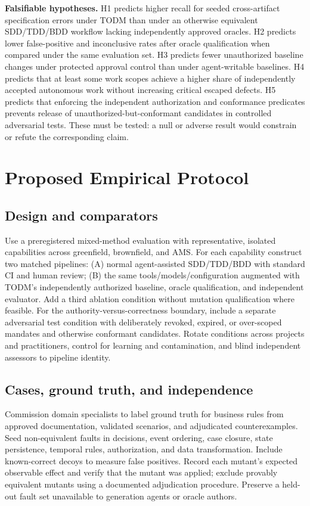 \documentclass[11pt,a4paper]{article}
\begin{document}
\textbf{Falsifiable hypotheses.} H1 predicts higher recall for seeded cross-artifact specification errors under TODM than under an otherwise equivalent SDD/TDD/BDD workflow lacking independently approved oracles. H2 predicts lower false-positive and inconclusive rates after oracle qualification when compared under the same evaluation set. H3 predicts fewer unauthorized baseline changes under protected approval control than under agent-writable baselines. H4 predicts that at least some work scopes achieve a higher share of independently accepted autonomous work without increasing critical escaped defects. H5 predicts that enforcing the independent authorization and conformance predicates prevents release of unauthorized-but-conformant candidates in controlled adversarial tests. These must be tested: a null or adverse result would constrain or refute the corresponding claim.

\section{Proposed Empirical Protocol}
\subsection{Design and comparators}
Use a preregistered mixed-method evaluation with representative, isolated capabilities across greenfield, brownfield, and AMS. For each capability construct two matched pipelines: (A) normal agent-assisted SDD/TDD/BDD with standard CI and human review; (B) the same tools/models/configuration augmented with TODM's independently authorized baseline, oracle qualification, and independent evaluator. Add a third ablation condition without mutation qualification where feasible. For the authority-versus-correctness boundary, include a separate adversarial test condition with deliberately revoked, expired, or over-scoped mandates and otherwise conformant candidates. Rotate conditions across projects and practitioners, control for learning and contamination, and blind independent assessors to pipeline identity.

\subsection{Cases, ground truth, and independence}
Commission domain specialists to label ground truth for business rules from approved documentation, validated scenarios, and adjudicated counterexamples. Seed non-equivalent faults in decisions, event ordering, case closure, state persistence, temporal rules, authorization, and data transformation. Include known-correct decoys to measure false positives. Record each mutant's expected observable effect and verify that the mutant was applied; exclude provably equivalent mutants using a documented adjudication procedure. Preserve a held-out fault set unavailable to generation agents or oracle authors.
\end{document}
